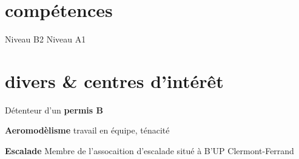 \documentclass{friggeri-cv} 	%
\begin{document}

\section{compétences}

\begin{capabilitize}
		{Niveau B2}
		{Niveau A1}
\end{capabilitize}


\section{divers \& centres d’intérêt}

Détenteur d’un \textbf{permis B}

\textbf{Aeromodèlisme} travail en équipe, ténacité

\textbf{Escalade} Membre de l'assocaition d'escalade situé à B'UP Clermont-Ferrand
\end{document}

